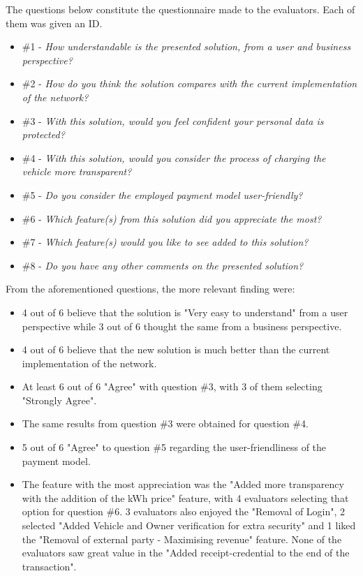 The questions below constitute the questionnaire made to the evaluators. Each of them was given an ID.

\begin{itemize}
    \item \#1 - \textit{How understandable is the presented solution, from a user and business perspective?}
    \item \#2 - \textit{How do you think the solution compares with the current implementation of the network?}
    \item \#3 - \textit{With this solution, would you feel confident your personal data is protected?}
    \item \#4 - \textit{With this solution, would you consider the process of charging the vehicle more transparent?}
    \item \#5 - \textit{Do you consider the employed payment model user-friendly?}
    \item \#6 - \textit{Which feature(s) from this solution did you appreciate the most?}
    \item \#7 - \textit{Which feature(s) would you like to see added to this solution?}
    \item \#8 - \textit{Do you have any other comments on the presented solution?}
\end{itemize}


From the aforementioned questions, the more relevant finding were:

\begin{itemize}
    \item 4 out of 6 believe that the solution is "Very easy to understand" from a user perspective while 3 out of 6 thought the same from a business perspective.
    \item 4 out of 6 believe that the new solution is much better than the current implementation of the network.
    \item At least 6 out of 6 "Agree" with question \#3, with 3 of them selecting "Strongly Agree".
    \item The same results from question \#3 were obtained for question \#4.
    \item 5 out of 6 "Agree" to question \#5 regarding the user-friendliness of the payment model.
    \item The feature with the most appreciation was the "Added more transparency with the addition of the kWh price" feature, with 4 evaluators selecting that option for question \#6. 3 evaluators also enjoyed the "Removal of Login", 2 selected "Added Vehicle and Owner verification for extra security" and 1 liked the "Removal of external party - Maximising revenue" feature. None of the evaluators saw great value in the "Added receipt-credential to the end of the transaction".
\end{itemize}

